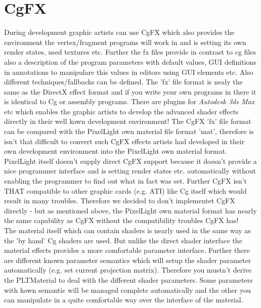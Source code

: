 \section{CgFX}
During development graphic artists can use CgFX which also provides the environment the vertex/fragment
programs will work in and is setting its own render states, used textures etc. Further the fx files
provide in contrast to cg files also a description of the program parameters with default values, \ac{GUI}
definitions in annotations to manipulare this values in editors using \ac{GUI} elements etc.
Also different techniques/fallbacks can be defined. The 'fx' file format is nealy the same as the
DirectX effect format and if you write your own programs in there it is identical to Cg or assembly
programs. There are plugins for \emph{Autodesk 3ds Max} etc which enables the graphic artists to develop the
advanced shader effects directly in their well kown development environment! The CgFX 'fx' file format
can be compared with the PixelLight own material file format 'mat', therefore is isn't that difficult to 
convert such CgFX effects artists had developed in their own development environment into the
PixelLight own material format.\\

PixelLight itself doesn't supply direct CgFX support because it doesn't provide a nice programmer
interface and is setting render states etc. automatically without enabling the programmer to find
out what in fact was set. Further CgFX isn't THAT compatible to other graphic cards (e.g. ATI) like
Cg itself which would result in many troubles. Therefore we decided to don't implementet CgFX directly
- but as mentioned above, the PixelLight own material format has nearly the same capability as CgFX
without the compatibility troubles CgFX has!\\

The material itself which can contain shaders is nearly used in the same way as the 'by hand' Cg shaders
are used. But unlike the direct shader interface the material effects provides a more comfortable
parameter interface. Further there are different known parameter semantics which will setup the
shader parameter automatically (e.g. set current projection matrix). Therefore you mustn't derive
the PLTMaterial to deal with the different shader parameters. Some parameters with kown semantic
will be managed complete automatically and the other you can manipulate in a quite comfortable way
over the interface of the material.\\




